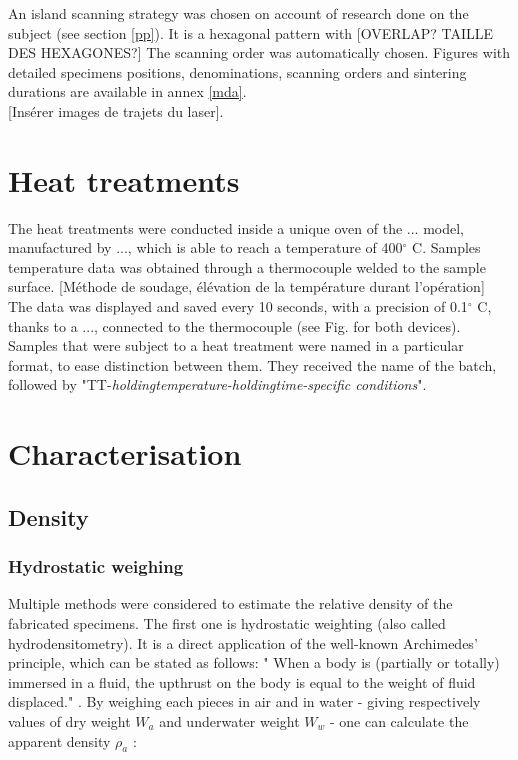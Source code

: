 An island scanning strategy was chosen on account of research done on the subject (see section \ref{pp}). It is a hexagonal pattern with [OVERLAP? TAILLE DES HEXAGONES?] The scanning order was automatically chosen. Figures with detailed specimens positions, denominations, scanning orders and sintering durations are available in annex \ref{mda}.\\

[Insérer images de trajets du laser].\\



\section{Heat treatments}
\label{MMHT}
The heat treatments were conducted inside a unique oven of the ... model, manufactured by ..., which is able to reach a temperature of 400$^\circ$ C. Samples temperature data was obtained through a thermocouple welded to the sample surface. [Méthode de soudage, élévation de la température durant l'opération] The data was displayed and saved every 10 seconds, with a precision of 0.1$^\circ$ C, thanks to a ..., connected to the thermocouple (see Fig. for both devices). \\

Samples that were subject to a heat treatment were named in a particular format, to ease distinction between them. They received the name of the batch, followed by "TT-\textit{holdingtemperature-holdingtime-specific conditions}".

\section{Characterisation}

\subsection{Density}

\subsubsection{Hydrostatic weighing}

Multiple methods were considered to estimate the relative density of the fabricated specimens. The first one is hydrostatic weighting (also called hydrodensitometry). It is a direct application of the well-known Archimedes' principle, which can be stated as follows: " When a body is (partially or totally) immersed in a fluid, the upthrust on the body is equal to the weight of fluid displaced." \parencite{ADictionaryofPhysics}. By weighing each pieces in air and in water - giving respectively values of dry weight $W_a$ and underwater weight $W_w$ - one can calculate the apparent density $\rho_a$ \parencite{MethArch}:

